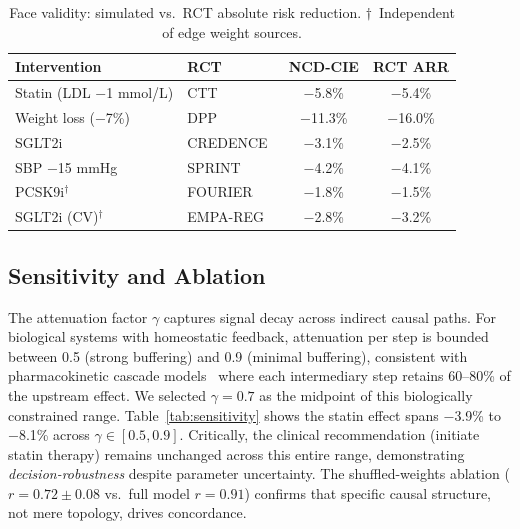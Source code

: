 \documentclass[runningheads]{llncs}
\begin{document}
\renewcommand{\arraystretch}{1.1}
\begin{table}[t]
\centering
\caption{Face validity: simulated vs.\ RCT absolute risk reduction.
$\dagger$~Independent of edge weight sources.}
\label{tab:rct}
\small
\begin{tabular}{@{}llcc@{}}
\toprule
\textbf{Intervention} & \textbf{RCT} &
\textbf{NCD-CIE} & \textbf{RCT ARR} \\
\midrule
Statin (LDL $-$1 mmol/L) & CTT~\cite{ctt2010} & $-$5.8\% & $-$5.4\% \\
Weight loss ($-$7\%) & DPP~\cite{knowler2002dpp} & $-$11.3\% & $-$16.0\% \\
SGLT2i & CREDENCE~\cite{perkovic2019credence} & $-$3.1\% & $-$2.5\% \\
SBP $-$15 mmHg & SPRINT~\cite{sprint2015} & $-$4.2\% & $-$4.1\% \\
PCSK9i$^\dagger$ & FOURIER~\cite{sabatine2017fourier} & $-$1.8\% & $-$1.5\% \\
SGLT2i (CV)$^\dagger$ & EMPA-REG~\cite{zinman2015empareg} & $-$2.8\% & $-$3.2\% \\
\bottomrule
\end{tabular}
\end{table}
\renewcommand{\arraystretch}{1.0}

\subsection{Sensitivity and Ablation}\label{sec:sensitivity}

The attenuation factor $\gamma$ captures signal decay across
indirect causal paths.
For biological systems with homeostatic feedback, attenuation per
step is bounded between 0.5 (strong buffering) and 0.9 (minimal
buffering), consistent with pharmacokinetic cascade
models~\cite{pearl2009causality} where each intermediary step
retains 60--80\% of the upstream effect.
We selected $\gamma = 0.7$ as the midpoint of this biologically
constrained range.
Table~\ref{tab:sensitivity} shows the statin effect spans
$-$3.9\% to $-$8.1\% across $\gamma \in [0.5, 0.9]$.
Critically, the clinical recommendation (initiate statin therapy)
remains unchanged across this entire range, demonstrating
\emph{decision-robustness} despite parameter uncertainty.
The shuffled-weights ablation ($r = 0.72 \pm 0.08$ vs.\ full model
$r = 0.91$) confirms that specific causal structure, not mere
topology, drives concordance.
\end{document}
